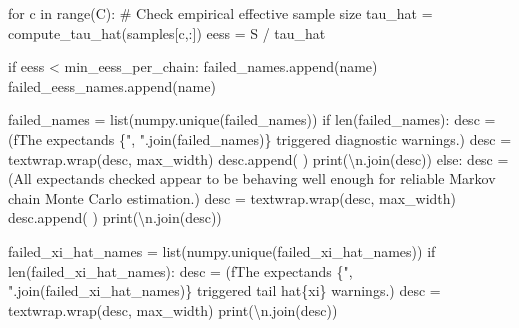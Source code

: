 \documentclass[
  letterpaper,
  DIV=11,
  numbers=noendperiod]{scrartcl}
\newenvironment{Shaded}{\begin{snugshade}}{\end{snugshade}}
\newcommand{\BuiltInTok}[1]{\textcolor[rgb]{0.00,0.23,0.31}{#1}}
\newcommand{\CharTok}[1]{\textcolor[rgb]{0.13,0.47,0.30}{#1}}
\newcommand{\CommentTok}[1]{\textcolor[rgb]{0.37,0.37,0.37}{#1}}
\newcommand{\ControlFlowTok}[1]{\textcolor[rgb]{0.00,0.23,0.31}{#1}}
\newcommand{\KeywordTok}[1]{\textcolor[rgb]{0.00,0.23,0.31}{#1}}
\newcommand{\NormalTok}[1]{\textcolor[rgb]{0.00,0.23,0.31}{#1}}
\newcommand{\OperatorTok}[1]{\textcolor[rgb]{0.37,0.37,0.37}{#1}}
\newcommand{\SpecialCharTok}[1]{\textcolor[rgb]{0.37,0.37,0.37}{#1}}
\newcommand{\SpecialStringTok}[1]{\textcolor[rgb]{0.13,0.47,0.30}{#1}}
\newcommand{\StringTok}[1]{\textcolor[rgb]{0.13,0.47,0.30}{#1}}
\begin{document}
\begin{Shaded}
\begin{Highlighting}[]
    \ControlFlowTok{for}\NormalTok{ c }\KeywordTok{in} \BuiltInTok{range}\NormalTok{(C):}
      \CommentTok{\# Check empirical effective sample size}
\NormalTok{      tau\_hat }\OperatorTok{=}\NormalTok{ compute\_tau\_hat(samples[c,:])}
\NormalTok{      eess }\OperatorTok{=}\NormalTok{ S }\OperatorTok{/}\NormalTok{ tau\_hat}
      
      \ControlFlowTok{if}\NormalTok{ eess }\OperatorTok{\textless{}}\NormalTok{ min\_eess\_per\_chain:}
\NormalTok{        failed\_names.append(name)}
\NormalTok{        failed\_eess\_names.append(name)}
  
\NormalTok{  failed\_names }\OperatorTok{=} \BuiltInTok{list}\NormalTok{(numpy.unique(failed\_names))}
  \ControlFlowTok{if} \BuiltInTok{len}\NormalTok{(failed\_names):}
\NormalTok{    desc }\OperatorTok{=}\NormalTok{ (}\SpecialStringTok{f\textquotesingle{}The expectands }\SpecialCharTok{\{}\StringTok{", "}\SpecialCharTok{.}\NormalTok{join(failed\_names)}\SpecialCharTok{\}}\SpecialStringTok{ \textquotesingle{}}
             \StringTok{\textquotesingle{}triggered diagnostic warnings.\textquotesingle{}}\NormalTok{)}
\NormalTok{    desc }\OperatorTok{=}\NormalTok{ textwrap.wrap(desc, max\_width)}
\NormalTok{    desc.append(}\StringTok{\textquotesingle{} \textquotesingle{}}\NormalTok{)}
    \BuiltInTok{print}\NormalTok{(}\StringTok{\textquotesingle{}}\CharTok{\textbackslash{}n}\StringTok{\textquotesingle{}}\NormalTok{.join(desc))}
  \ControlFlowTok{else}\NormalTok{:}
\NormalTok{    desc }\OperatorTok{=}\NormalTok{ (}\StringTok{\textquotesingle{}All expectands checked appear to be behaving well enough \textquotesingle{}}
            \StringTok{\textquotesingle{}for reliable Markov chain Monte Carlo estimation.\textquotesingle{}}\NormalTok{)}
\NormalTok{    desc }\OperatorTok{=}\NormalTok{ textwrap.wrap(desc, max\_width)}
\NormalTok{    desc.append(}\StringTok{\textquotesingle{} \textquotesingle{}}\NormalTok{)}
    \BuiltInTok{print}\NormalTok{(}\StringTok{\textquotesingle{}}\CharTok{\textbackslash{}n}\StringTok{\textquotesingle{}}\NormalTok{.join(desc))}
  
\NormalTok{  failed\_xi\_hat\_names }\OperatorTok{=} \BuiltInTok{list}\NormalTok{(numpy.unique(failed\_xi\_hat\_names))}
  \ControlFlowTok{if} \BuiltInTok{len}\NormalTok{(failed\_xi\_hat\_names):}
\NormalTok{    desc }\OperatorTok{=}\NormalTok{ (}\SpecialStringTok{f\textquotesingle{}The expectands }\SpecialCharTok{\{}\StringTok{", "}\SpecialCharTok{.}\NormalTok{join(failed\_xi\_hat\_names)}\SpecialCharTok{\}}\SpecialStringTok{ \textquotesingle{}}
             \StringTok{\textquotesingle{}triggered tail hat}\SpecialCharTok{\{xi\}}\StringTok{ warnings.\textquotesingle{}}\NormalTok{)}
\NormalTok{    desc }\OperatorTok{=}\NormalTok{ textwrap.wrap(desc, max\_width)}
    \BuiltInTok{print}\NormalTok{(}\StringTok{\textquotesingle{}}\CharTok{\textbackslash{}n}\StringTok{\textquotesingle{}}\NormalTok{.join(desc))}
    

\end{Highlighting}
\end{Shaded}
\end{document}
